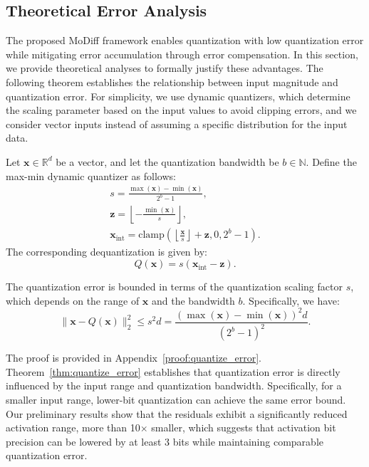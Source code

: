 \subsection{Theoretical Error Analysis}
\label{subsec:theory}
The proposed MoDiff framework enables quantization with low quantization error while mitigating error accumulation through error compensation. In this section, we provide theoretical analyses to formally justify these advantages. The following theorem establishes the relationship between input magnitude and quantization error. For simplicity, we use dynamic quantizers, which determine the scaling parameter based on the input values to avoid clipping errors, and we consider vector inputs instead of assuming a specific distribution for the input data.
\begin{theorem}
\label{thm:quantize_error}
Let \( \mathbf{x} \in \mathbb{R}^d \) be a vector, and let the quantization bandwidth be \( b \in \mathbb{N} \). Define the max-min dynamic quantizer as follows:
\begin{gather}
    s  = \frac{\max(\mathbf{x}) - \min(\mathbf{x})}{2^b - 1}, \\
    \mathbf{z}  = \left\lfloor -\frac{\min(\mathbf{x})}{s} \right\rfloor, \\
    \mathbf{x}_\text{int}  = \text{clamp}(\left\lfloor \frac{\mathbf{x}}{s} \right\rfloor + \mathbf{z}, 0, 2^b-1).
\end{gather}
The corresponding dequantization is given by:
\begin{equation}
    Q(\mathbf{x}) = s (\mathbf{x}_\text{int} - \mathbf{z}).
\end{equation}

The quantization error is bounded in terms of the quantization scaling factor \( s \), which depends on the range of \( \mathbf{x} \) and the bandwidth \( b \). Specifically, we have:
\begin{equation}
    \|\mathbf{x} - Q(\mathbf{x})\|_2^2 \leq {s^2d} = \frac{(\max(\mathbf{x}) - \min(\mathbf{x}))^2d}{(2^b - 1)^2}.
\end{equation}
\end{theorem}
The proof is provided in Appendix~\ref{proof:quantize_error}. Theorem~\ref{thm:quantize_error} establishes that quantization error is directly influenced by the input range and quantization bandwidth. Specifically, for a smaller input range, lower-bit quantization can achieve the same error bound. Our preliminary results show that the residuals exhibit a significantly reduced activation range, more than 10$\times$ smaller, which suggests that activation bit precision can be lowered by at least 3 bits while maintaining comparable quantization error.  

